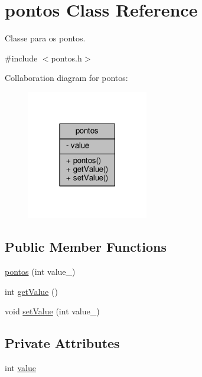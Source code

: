 \hypertarget{classpontos}{}\section{pontos Class Reference}
\label{classpontos}


Classe para os pontos.  




{\ttfamily \#include $<$pontos.\+h$>$}



Collaboration diagram for pontos\+:
\nopagebreak
\begin{figure}[H]
\begin{center}
\leavevmode
\includegraphics[width=150pt]{classpontos__coll__graph}
\end{center}
\end{figure}
\subsection*{Public Member Functions}
\begin{DoxyCompactItemize}
\item 
\hyperlink{classpontos_ac2c939539723b5f20054239c0c78ef59}{pontos} (int value\+\_\+)
\item 
int \hyperlink{classpontos_a928ec19b58787b0dec93b801a9670070}{get\+Value} ()
\item 
void \hyperlink{classpontos_a75f82ace742aedeb18c05e4130f45951}{set\+Value} (int value\+\_\+)
\end{DoxyCompactItemize}
\subsection*{Private Attributes}
\begin{DoxyCompactItemize}
\item 
int \hyperlink{classpontos_a776f5643630f9aec273380a31d0e6e47}{value}
\end{DoxyCompactItemize}


